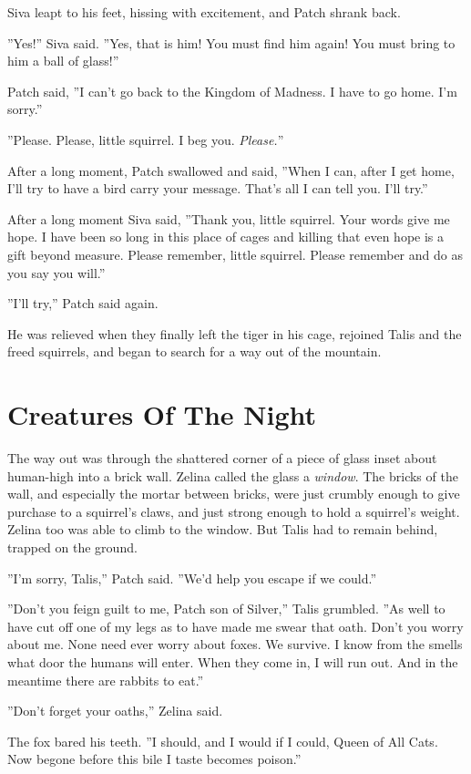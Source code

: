 \documentclass[12pt]{book}
\begin{document}
Siva leapt to his feet, hissing with excitement, and Patch shrank back.

''Yes!'' Siva said. ''Yes, that is him! You must find him again! You must bring to him a ball of glass!''

Patch said, ''I can't go back to the Kingdom of Madness. I have to go home. I'm sorry.''

''Please. Please, little squirrel. I beg you. {\it Please.}''

After a long moment, Patch swallowed and said, ''When I can, after I get home, I'll try to have a bird carry your message. That's all I can tell you. I'll try.''

After a long moment Siva said, ''Thank you, little squirrel. Your words give me hope. I have been so long in this place of cages and killing that even hope is a gift beyond measure. Please remember, little squirrel. Please remember and do as you say you will.''

''I'll try,'' Patch said again.

He was relieved when they finally left the tiger in his cage, rejoined Talis and the freed squirrels, and began to search for a way out of the mountain.


\section{Creatures Of The Night}

The way out was through the shattered corner of a piece of glass inset about human-high into a brick wall. Zelina called the glass a {\it window}. The bricks of the wall, and especially the mortar between bricks, were just crumbly enough to give purchase to a squirrel's claws, and just strong enough to hold a squirrel's weight. Zelina too was able to climb to the window. But Talis had to remain behind, trapped on the ground.

''I'm sorry, Talis,'' Patch said. ''We'd help you escape if we could.''

''Don't you feign guilt to me, Patch son of Silver,'' Talis grumbled. ''As well to have cut off one of my legs as to have made me swear that oath. Don't you worry about me. None need ever worry about foxes. We survive. I know from the smells what door the humans will enter. When they come in, I will run out. And in the meantime there are rabbits to eat.''

''Don't forget your oaths,'' Zelina said.

The fox bared his teeth. ''I should, and I would if I could, Queen of All Cats. Now begone before this bile I taste becomes poison.''
\end{document}
